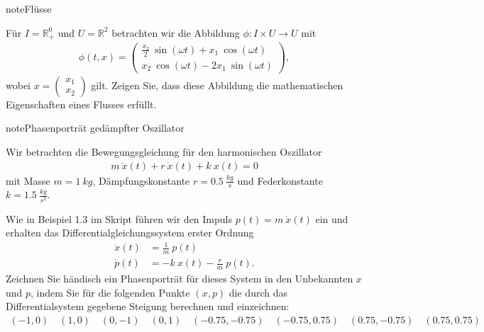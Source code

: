 \documentclass[letterpaper,10pt,english]{jupyterBook}
\begin{document}
\begin{sphinxadmonition}{note}{Flüsse}

\sphinxAtStartPar
Für \(I = \mathbb{R}^0_+\) und \(U = \mathbb{R}^2\) betrachten wir die Abbildung \(\phi: I \times U \rightarrow U\) mit
\begin{equation*}
\begin{split}\phi(t, x) = 
\begin{pmatrix} \frac{x_2}{2} ~ \sin(\omega t) + x_1 ~ \cos(\omega t) \\ x_2 ~ \cos(\omega t) - 2 x_1 ~ \sin(\omega t) \end{pmatrix}, \end{split}
\end{equation*}
\sphinxAtStartPar
wobei \(x = \begin{pmatrix} x_1 \\ x_2 \end{pmatrix}\) gilt.
Zeigen Sie, dass diese Abbildung die mathematischen Eigenschaften eines Flusses erfüllt.
\end{sphinxadmonition}

\begin{sphinxadmonition}{note}{Phasenporträt gedämpfter Oszillator}

\sphinxAtStartPar
Wir betrachten die Bewegungsgleichung für den harmonischen Oszillator
\begin{equation*}
\begin{split}m ~ \ddot x(t) + r ~ \dot x(t) + k ~ x(t) = 0\end{split}
\end{equation*}
\sphinxAtStartPar
mit Masse \(m = 1  ~ kg\), Dämpfungskonstante \(r = 0.5 ~ \frac{kg}{s}\) und Federkonstante \(k = 1.5 ~ \frac{kg}{s^2}\).

\sphinxAtStartPar
Wie in Beispiel 1.3 im Skript führen wir den Impuls \(p(t) = m ~ \dot x(t)\) ein und erhalten das Differentialgleichungssystem erster Ordnung
\begin{equation*}
\begin{split}\dot x(t) &= \frac{1}{m} ~ p(t)\\
\dot p(t) &= -k ~ x(t) - \frac{r}{m} ~ p(t).\end{split}
\end{equation*}
\sphinxAtStartPar
Zeichnen Sie händisch ein Phasenporträt für dieses System in den Unbekannten \(x\) und \(p\), indem Sie für die folgenden Punkte \((x,p)\) die durch das Differentialsystem gegebene Steigung berechnen und einzeichnen:
\begin{equation*}
\begin{split}(-1, 0) \quad  (1, 0) \quad (0, -1) \quad  (0, 1) \quad (-0.75, -0.75) \quad  (-0.75, 0.75) \quad (0.75, -0.75) \quad (0.75, 0.75)\end{split}
\end{equation*}\end{sphinxadmonition}
\end{document}
